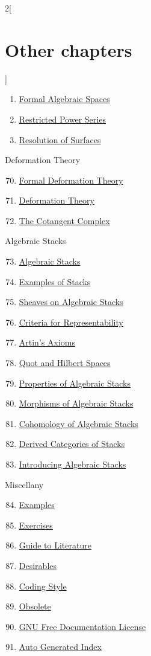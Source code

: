 \begin{multicols}{2}[\section{Other chapters}]
\begin{enumerate}
\item \hyperref[formal-spaces-section-phantom]{Formal Algebraic Spaces}
\item \hyperref[restricted-section-phantom]{Restricted Power Series}
\item \hyperref[resolve-section-phantom]{Resolution of Surfaces}
\end{enumerate}
Deformation Theory
\begin{enumerate}
\setcounter{enumi}{69}
\item \hyperref[formal-defos-section-phantom]{Formal Deformation Theory}
\item \hyperref[defos-section-phantom]{Deformation Theory}
\item \hyperref[cotangent-section-phantom]{The Cotangent Complex}
\end{enumerate}
Algebraic Stacks
\begin{enumerate}
\setcounter{enumi}{72}
\item \hyperref[algebraic-section-phantom]{Algebraic Stacks}
\item \hyperref[examples-stacks-section-phantom]{Examples of Stacks}
\item \hyperref[stacks-sheaves-section-phantom]{Sheaves on Algebraic Stacks}
\item \hyperref[criteria-section-phantom]{Criteria for Representability}
\item \hyperref[artin-section-phantom]{Artin's Axioms}
\item \hyperref[quot-section-phantom]{Quot and Hilbert Spaces}
\item \hyperref[stacks-properties-section-phantom]{Properties of Algebraic Stacks}
\item \hyperref[stacks-morphisms-section-phantom]{Morphisms of Algebraic Stacks}
\item \hyperref[stacks-cohomology-section-phantom]{Cohomology of Algebraic Stacks}
\item \hyperref[stacks-perfect-section-phantom]{Derived Categories of Stacks}
\item \hyperref[stacks-introduction-section-phantom]{Introducing Algebraic Stacks}
\end{enumerate}
Miscellany
\begin{enumerate}
\setcounter{enumi}{83}
\item \hyperref[examples-section-phantom]{Examples}
\item \hyperref[exercises-section-phantom]{Exercises}
\item \hyperref[guide-section-phantom]{Guide to Literature}
\item \hyperref[desirables-section-phantom]{Desirables}
\item \hyperref[coding-section-phantom]{Coding Style}
\item \hyperref[obsolete-section-phantom]{Obsolete}
\item \hyperref[fdl-section-phantom]{GNU Free Documentation License}
\item \hyperref[index-section-phantom]{Auto Generated Index}
\end{enumerate}
\end{multicols}
